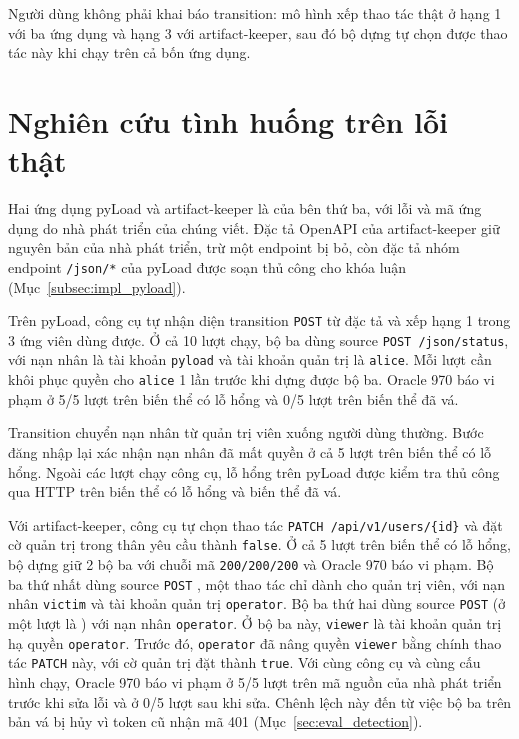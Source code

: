 Người dùng không phải khai báo transition: mô hình xếp thao tác thật ở hạng 1 với ba ứng dụng và hạng 3 với artifact-keeper, sau đó bộ dựng tự chọn được thao tác này khi chạy trên cả bốn ứng dụng.

\section{Nghiên cứu tình huống trên lỗi thật}
\label{sec:eval_cases}

Hai ứng dụng pyLoad và artifact-keeper là của bên thứ ba, với lỗi và mã ứng dụng do nhà phát triển của chúng viết. Đặc tả OpenAPI của artifact-keeper giữ nguyên bản của nhà phát triển, trừ một endpoint bị bỏ, còn đặc tả nhóm endpoint \texttt{/json/*} của pyLoad được soạn thủ công cho khóa luận (Mục~\ref{subsec:impl_pyload}).

Trên pyLoad, công cụ tự nhận diện transition \texttt{POST}  từ đặc tả và xếp hạng 1 trong 3 ứng viên dùng được. Ở cả 10 lượt chạy, bộ ba dùng source \texttt{POST /json/status}, với nạn nhân là tài khoản \texttt{pyload} và tài khoản quản trị là \texttt{alice}. Mỗi lượt cần khôi phục quyền cho \texttt{alice} 1 lần trước khi dựng được bộ ba. Oracle 970 báo vi phạm ở 5/5 lượt trên biến thể có lỗ hổng và 0/5 lượt trên biến thể đã vá.

Transition chuyển nạn nhân từ quản trị viên xuống người dùng thường. Bước đăng nhập lại xác nhận nạn nhân đã mất quyền ở cả 5 lượt trên biến thể có lỗ hổng. Ngoài các lượt chạy công cụ, lỗ hổng trên pyLoad được kiểm tra thủ công qua HTTP trên biến thể có lỗ hổng và biến thể đã vá.

Với artifact-keeper, công cụ tự chọn thao tác \texttt{PATCH /api/v1/users/\{id\}} và đặt cờ quản trị trong thân yêu cầu thành \texttt{false}. Ở cả 5 lượt trên biến thể có lỗ hổng, bộ dựng giữ 2 bộ ba với chuỗi mã \texttt{200/200/200} và Oracle 970 báo vi phạm. Bộ ba thứ nhất dùng source \texttt{POST} , một thao tác chỉ dành cho quản trị viên, với nạn nhân \texttt{victim} và tài khoản quản trị \texttt{operator}. Bộ ba thứ hai dùng source \texttt{POST}  (ở một lượt là ) với nạn nhân \texttt{operator}. Ở bộ ba này, \texttt{viewer} là tài khoản quản trị hạ quyền \texttt{operator}. Trước đó, \texttt{operator} đã nâng quyền \texttt{viewer} bằng chính thao tác \texttt{PATCH} này, với cờ quản trị đặt thành \texttt{true}. Với cùng công cụ và cùng cấu hình chạy, Oracle 970 báo vi phạm ở 5/5 lượt trên mã nguồn của nhà phát triển trước khi sửa lỗi và ở 0/5 lượt sau khi sửa. Chênh lệch này đến từ việc bộ ba trên bản vá bị hủy vì token cũ nhận mã 401 (Mục~\ref{sec:eval_detection}).

